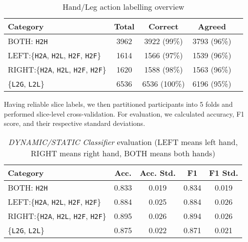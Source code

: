 \begin{table}[htp]
    \centering
    \begin{tabular}{lcccc}
        \toprule
        Category & Total & Correct & Agreed \\
        \midrule
        BOTH: \texttt{H2H} & 3962 & 3922 (99\%) & 3793 (96\%)\\
        LEFT:\{\texttt{H2A}, \texttt{H2L}, \texttt{H2F}, \texttt{H2F}\} & 1614 & 1566 (97\%) & 1539 (96\%)\\
        RIGHT:\{\texttt{H2A}, \texttt{H2L}, \texttt{H2F}, \texttt{H2F}\} & 1620 & 1588 (98\%) & 1563 (96\%)\\
        \{\texttt{L2G}, \texttt{L2L}\} & 6536 & 6536 (100\%) & 6196 (95\%)\\
        \bottomrule
    \end{tabular}
    \vspace{0.1cm}
    \caption{Hand/Leg action labelling overview}
    \vspace{-5mm}
    \label{tab:action_detector_labelling}
\end{table}

Having reliable slice labels, we then partitioned participants into 5 folds and performed slice-level cross-validation.
For evaluation, we calculated accuracy, F1 score, and their respective standard deviations.

\begin{table}[htp]
    \centering
    \begin{tabular}{lcccc}
        \toprule
        Category & Acc. & Acc. Std. & F1 & F1 Std.\\
        \midrule
        BOTH: \texttt{H2H} & 0.833 & 0.019 & 0.834 & 0.019\\
        LEFT:\{\texttt{H2A}, \texttt{H2L}, \texttt{H2F}, \texttt{H2F}\} & 0.884 & 0.025 & 0.884 & 0.026\\
        RIGHT:\{\texttt{H2A}, \texttt{H2L}, \texttt{H2F}, \texttt{H2F}\} & 0.895 & 0.026 & 0.894 & 0.026\\
        \{\texttt{L2G}, \texttt{L2L}\} & 0.875 & 0.022 & 0.871 & 0.021\\
        \bottomrule
    \end{tabular}
    \vspace{0.1cm}
    \caption{\textit{DYNAMIC/STATIC Classifier} evaluation (LEFT means left hand, RIGHT means right hand, BOTH means both hands)}
    \vspace{-0.6cm}
    \label{tab:action_detector_evaluation}
\end{table}

